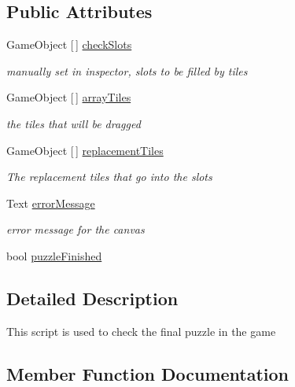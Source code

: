 \subsection*{Public Attributes}
\begin{DoxyCompactItemize}
\item 
Game\+Object \mbox{[}$\,$\mbox{]} \hyperlink{class_final_puzzle_completion_check_afeeb6c56f30c0f636803891a7dd3f53a}{check\+Slots}
\begin{DoxyCompactList}\small\item\em manually set in inspector, slots to be filled by tiles \end{DoxyCompactList}\item 
Game\+Object \mbox{[}$\,$\mbox{]} \hyperlink{class_final_puzzle_completion_check_ab25b67e68be39b9459b6b0f6aa8429b9}{array\+Tiles}
\begin{DoxyCompactList}\small\item\em the tiles that will be dragged \end{DoxyCompactList}\item 
Game\+Object \mbox{[}$\,$\mbox{]} \hyperlink{class_final_puzzle_completion_check_a778ec2e2631b81862469ef127e2799db}{replacement\+Tiles}
\begin{DoxyCompactList}\small\item\em The replacement tiles that go into the slots \end{DoxyCompactList}\item 
Text \hyperlink{class_final_puzzle_completion_check_adf7b1db99726b1744800ff53f9fd32dd}{error\+Message}
\begin{DoxyCompactList}\small\item\em error message for the canvas \end{DoxyCompactList}\item 
bool \hyperlink{class_final_puzzle_completion_check_ad5b37fa48358e0e302c312e015875b4d}{puzzle\+Finished}
\end{DoxyCompactItemize}


\subsection{Detailed Description}
This script is used to check the final puzzle in the game 

\subsection{Member Function Documentation}
\mbox{\label{class_final_puzzle_completion_check_a2cd4702593ffbf8357cc0eddf24f553e}} 
